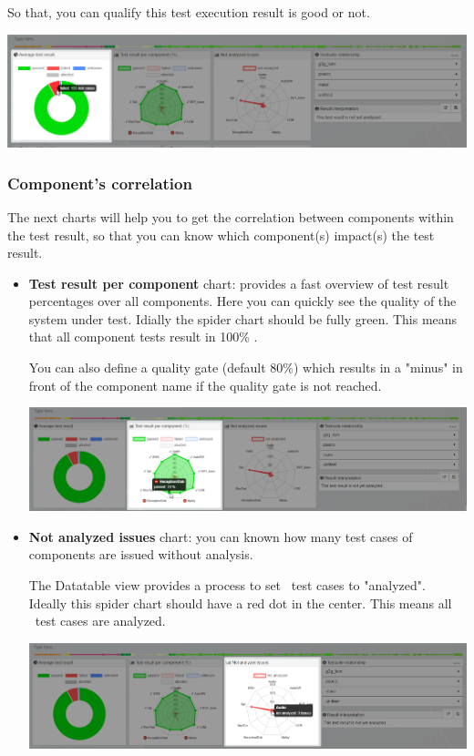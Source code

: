 So that, you can qualify this test execution result is good or not.

\includegraphics[width=1\linewidth]
{./pictures/dashboard/chart_average_test_result.png}

\subsubsection{Component's correlation}
The next charts will help you to get the correlation between components within
the test result, so that you can know which component(s) impact(s) the test
result.

\begin{itemize}
\item \textbf{Test result per component} chart: provides a fast overview of
test result percentages over all components. Here you can quickly see
the quality of the system under test. Idially the spider chart should
be fully green. This means that all component tests result in 100\% \passed.

You can also define a quality gate (default 80\%) which results in a "minus"
in front of the component name if the quality gate is not reached.


\includegraphics[width=1\linewidth]
{./pictures/dashboard/chart_test_result_per_component.png}


\item \textbf{Not analyzed issues} chart: you can known how many test cases of
components are issued without analysis.

The Datatable view provides a process to set \failed\ test cases to
"analyzed". Ideally this spider chart should have a red dot in the center.
This means all \failed\ test cases are analyzed.

\includegraphics[width=1\linewidth]
{./pictures/dashboard/chart_not_analyzed_issues.png}
\end{itemize}

